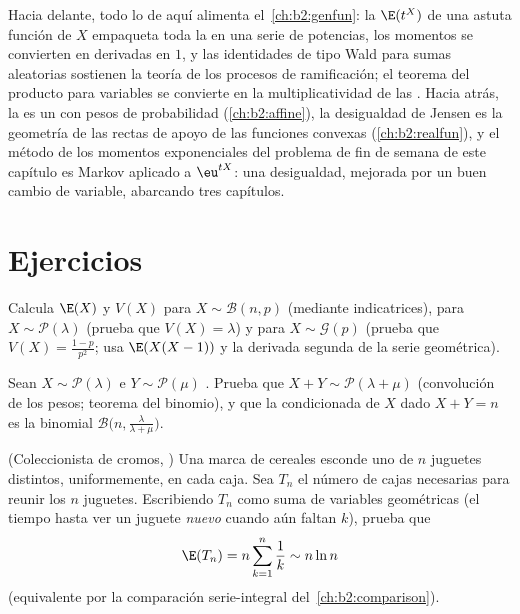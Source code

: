 \begin{remark}
Hacia delante, todo lo de aquí alimenta el~\cref{ch:b2:genfun}: la
 $\E(t^X)$ de una astuta función de $X$ empaqueta toda la
 en una serie de potencias, los momentos se convierten en
derivadas en $1$, y las identidades de tipo Wald para sumas
aleatorias sostienen la teoría de los procesos de ramificación; el
teorema del producto para variables  se convierte en la
multiplicatividad de las . Hacia atrás, la
 es un  con pesos de probabilidad
(\cref{ch:b2:affine}), la desigualdad de Jensen es la geometría de
las rectas de apoyo de las funciones convexas
(\cref{ch:b2:realfun}), y el método de los momentos exponenciales del
problema de fin de semana de este capítulo es Markov aplicado a
$\eu^{tX}$: una desigualdad, mejorada por un buen cambio de variable,
abarcando tres capítulos.
\end{remark}

\section{Ejercicios}

\begin{exercise}[$\star$]\label{exo:b2:randomvar:1}
Calcula $\E(X)$ y $V(X)$ para $X \sim \mathcal{B}(n, p)$ (mediante
indicatrices), para $X \sim \mathcal{P}(\lambda)$ (prueba que $V(X) =
\lambda$) y para $X \sim \mathcal{G}(p)$ (prueba que $V(X) =
\frac{1-p}{p^2}$; usa $\E(X(X-1))$ y la derivada segunda de la serie
geométrica).
\end{exercise}

\begin{exercise}[$\star$]\label{exo:b2:randomvar:2}
Sean $X \sim \mathcal{P}(\lambda)$ e $Y \sim \mathcal{P}(\mu)$
. Prueba que $X + Y \sim \mathcal{P}(\lambda + \mu)$
(convolución de los pesos; teorema del binomio), y que la 
condicionada de $X$ dado $X + Y = n$ es la binomial
$\mathcal{B}\bigl(n, \frac{\lambda}{\lambda + \mu}\bigr)$.
\end{exercise}

\begin{exercise}[$\star$]\label{exo:b2:randomvar:3}
(Coleccionista de cromos, ) Una marca de cereales esconde
uno de $n$ juguetes distintos, uniformemente, en cada caja. Sea $T_n$
el número de cajas necesarias para reunir los $n$ juguetes.
Escribiendo $T_n$ como suma de variables geométricas 
(el tiempo hasta ver un juguete \emph{nuevo} cuando aún faltan $k$),
prueba que
\[
\E(T_n) = n\sum_{k=1}^{n}\frac{1}{k} \sim n\ln n
\]
(equivalente por la comparación serie-integral del~\cref{ch:b2:comparison}).
\end{exercise}

